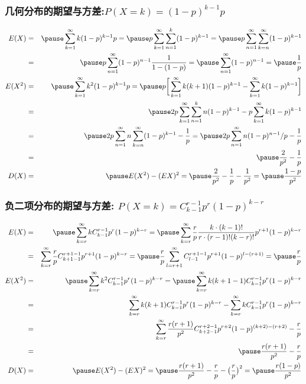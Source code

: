 \documentclass[Prob-All.tex]{subfiles}
\begin{document}
	\begin{frame}
		\frametitle{几何分布的期望与方差:$P (X=k)=(1-p)^{k-1} p$}
		\vspace{-0.6cm}
		{\small \begin{eqnarray*}
				\hspace{-0.5cm} E(X)&=&\pause \sum_{k=1}^\infty k (1-p)^{k-1}p=\pause p\sum_{k=1}^\infty \sum_{n=1}^k(1-p)^{k-1}=\pause p\sum_{n=1}^\infty\sum_{k=n}^\infty (1-p)^{k-1}\\
				&=&\pause p\sum_{n=1}^\infty (1-p)^{n-1}\dfrac{1}{1-(1-p)}=\pause\sum_{n=1}^\infty (1-p)^{n-1}=\pause  \dfrac{1}{p}\\
				E(X^2)&=&\pause \sum_{k=1}^\infty k^2 (1-p)^{k-1}p=\pause p\bigg[\sum_{k=1}^\infty k(k+1)(1-p)^{k-1}-\sum_{k=1}^\infty k(1-p)^{k-1}\bigg]\\
				&=&\pause 2p\sum_{k=1}^\infty\sum_{n=1}^kn (1-p)^{k-1}-p\sum_{k=1}^\infty k (1-p)^{k-1}\\
				&=&\pause 2p\sum_{n=1}^\infty n\sum_{k=n}^\infty (1-p)^{k-1}-\dfrac{1}{p}=\pause 2p\sum_{n=1}^\infty n(1-p)^{n-1}/p-\dfrac{1}{p}\\
				&=&\pause \dfrac{2}{p^2}-\dfrac{1}{p}\\
				D(X)&=&\pause E(X^2)-(EX)^2=\pause \dfrac{2}{p^2}-\dfrac{1}{p}-\dfrac{1}{p^2}=\pause \dfrac{1-p}{p^2}
		\end{eqnarray*}}

	\end{frame}
	\begin{frame}
		\frametitle{负二项分布的期望与方差: $P (X=k)=C_{k-1}^{r-1} p^r (1-p)^{k-r}$}
		\vspace{-0.6cm}
		{\small \begin{eqnarray*}
				\hspace{-0.5cm} E(X)&=&\pause \sum_{k=r}^\infty k C_{k-1}^{r-1}p^r(1-p)^{k-r}=\pause \sum_{k=r}^\infty\dfrac{r}{p} \dfrac{k\cdot (k-1)!}{r\cdot (r-1)!(k-r)!}p^{r+1}(1-p)^{k-r}\\
				&=&\sum_{k=r}^\infty\dfrac{r}{p} C_{k+1-1}^{r+1-1}p^{r+1}(1-p)^{k-r}=\pause \dfrac{r}{p}\sum_{l=r+1}^\infty C_{l-1}^{r+1-1}p^{r+1}(1-p)^{l-(r+1)}=\pause \dfrac{r}{p}\\
				E(X^2)&=&\pause \sum_{k=r}^\infty k^2 C_{k-1}^{r-1}p^r(1-p)^{k-r}=\pause \sum_{k=r}^\infty k(k+1-1) C_{k-1}^{r-1}p^r(1-p)^{k-r}\\
				&=&\sum_{k=r}^\infty k(k+1) C_{k-1}^{r-1}p^r(1-p)^{k-r}-\sum_{k=r}^\infty k C_{k-1}^{r-1}p^r(1-p)^{k-r}\\
				&=&\sum_{k=r}^\infty\dfrac{r(r+1)}{p^2} C_{k+2-1}^{r+2-1}p^{r+2}(1-p)^{(k+2)-(r+2)}-\dfrac{r}{p}\\
				&=&\pause \dfrac{r(r+1)}{p^2}-\dfrac{r}{p}\\
				D(X)&=&\pause E(X^2)-(EX)^2=\pause \dfrac{r(r+1)}{p^2}-\dfrac{r}{p}-\big(\dfrac{r}{p}\big)^2=\pause \dfrac{r(1-p)}{p^2}
		\end{eqnarray*}}
	\end{frame}
\end{document}

